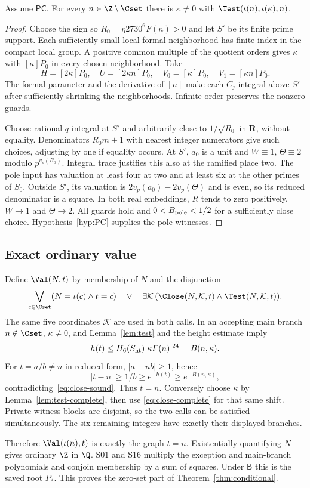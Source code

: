 \begin{lemma}\label{lem:test-complete}
Assume $\mathsf{PC}$. For every $n\in\Z\setminus\Cset$ there is
$\kappa\ne0$ with $\Test(\iota(n),\iota(\kappa),n)$.
\end{lemma}
\begin{proof}
Choose the sign so $R_0=\eta2730^6F(n)>0$ and let $S'$ be its finite
prime support. Each sufficiently small local formal neighborhood has
finite index in the compact local group. A positive common multiple
of the quotient orders gives $\kappa$ with $[\kappa]P_0$ in every
chosen neighborhood. Take
\[
 H=[2\kappa]P_0,\quad U=[2\kappa n]P_0,\quad
 V_0=[\kappa]P_0,\quad V_1=[\kappa n]P_0.
\]
The formal parameter and the derivative of $[n]$ make each $C_j$
integral above $S'$ after sufficiently shrinking the neighborhoods.
Infinite order preserves the nonzero guards.

Choose rational $q$ integral at $S'$ and arbitrarily close to
$1/\sqrt{R_0}$ in $\mathbf R$, without equality. Denominators
$R_0m+1$ with nearest integer numerators give such choices, adjusting
by one if equality occurs. At $S'$, $a_0$ is a unit and
$W\equiv1$, $\Theta\equiv2$ modulo $p^{v_p(R_0)}$.
Integral trace justifies this also at the ramified place two.
The pole input has valuation at least four at two and at least six
at the other primes of $S_0$. Outside $S'$, its valuation is
$2v_p(a_0)-2v_p(\Theta)$ and is even, so its reduced denominator is
a square. In both real embeddings, $R$ tends to zero positively,
$W\to1$ and $\Theta\to2$. All guards hold and
$0<B_{\rm pole}<1/2$ for a sufficiently close choice.
Hypothesis~\ref{hyp:PC} supplies the pole witnesses.
\end{proof}

\subsection{Exact ordinary value}
Define $\Val(N,t)$ by membership of $N$ and the disjunction
\[
 \bigvee_{c\in\Cset}(N=\iota(c)\wedge t=c)
 \quad\vee\quad
 \exists\mathcal K\,
 (\Close(N,\mathcal K,t)\wedge\Test(N,\mathcal K,t)).
\]
The same five coordinates $\mathcal K$ are used in both calls.
In an accepting main branch $n\notin\Cset$, $\kappa\ne0$, and
Lemma~\ref{lem:test} and the height estimate imply
\[
 h(t)\le H_6(S_{\rm ht})|\kappa F(n)|^{24}=B(n,\kappa).
\]
For $t=a/b\ne n$ in reduced form, $|a-nb|\ge1$, hence
\[
 |t-n|\ge1/b\ge e^{-h(t)}\ge e^{-B(n,\kappa)},
\]
contradicting~\eqref{eq:close-sound}. Thus $t=n$.
Conversely choose $\kappa$ by Lemma~\ref{lem:test-complete}, then use
\eqref{eq:close-complete} for that same shift. Private witness blocks
are disjoint, so the two calls can be satisfied simultaneously.
The six remaining integers have exactly their displayed branches.

Therefore $\Val(\iota(n),t)$ is exactly the graph $t=n$.
Existentially quantifying $N$ gives ordinary $\Z$ in $\Q$.
S01 and S16 multiply the exception and main-branch polynomials and
conjoin membership by a sum of squares. Under $\mathsf B$ this is
the saved root $P_*$. This proves the zero-set part of
Theorem~\ref{thm:conditional}.
